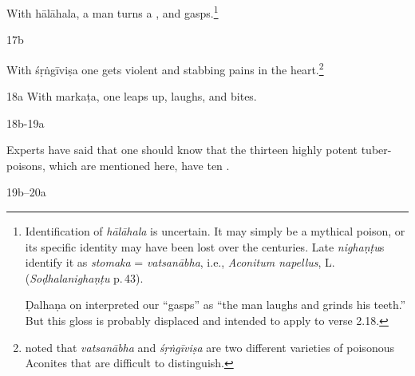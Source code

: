 \begin{translation}
    With \gls{hālāhala}, a man turns a , and
gasps.\footnote{Identification of \emph{hālāhala} is  uncertain. It may simply
be a mythical poison, or its specific identity may have been lost over the
centuries. Late \emph{nighaṇṭu}s identify it as \emph{stomaka} =
\emph{vatsanābha}, i.e., \emph{Aconitum napellus}, L. 
(\emph{Soḍhalanighaṇṭu} p.\,43). 

Ḍalhaṇa on  interpreted our “gasps” as “the man laughs 
and grinds his teeth.”  But this gloss is probably displaced and intended to 
apply to verse 2.18.}


\item[ 17b] 

With \gls{śṛṅgīviṣa}
one gets violent
 and stabbing pains in the 
heart.\footnote{\citet[407]{gvdb} noted that \emph{vatsanābha} and 
\emph{śṛṅgīviṣa} are two different varieties of poisonous Aconites that are 
difficult to distinguish.}
    
    \item[ 18a]
    With
    \gls{markaṭa}, one leaps up, laughs, and 
    bites.
    
    
    \item[ 18b-19a]
    
    Experts have said that one should know that the thirteen highly potent 
    tuber-poisons, which are mentioned here, have ten .
    
    \item[ 19b--20a]
    

\end{translation}
